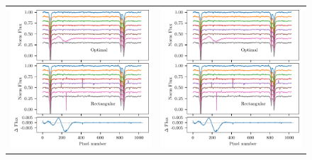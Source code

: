 \begin{figure}
\begin{tabular}{cc}
     \includegraphics[width=\hsize/2]{figures/reduction/Bad_pixel_replacement} & 
     \includegraphics[width=\hsize/2]{figures/reduction/Bad_pixel_replacement}
     \end{tabular}

\end{figure}
